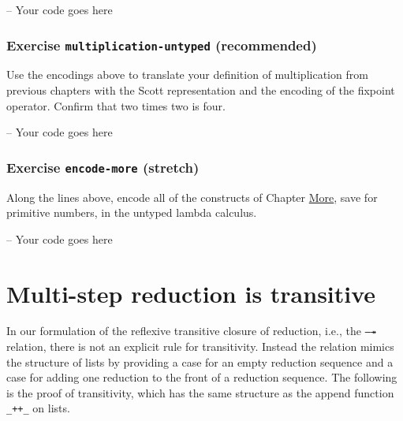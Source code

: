 \begin{fence}
\begin{code}
-- Your code goes here
\end{code}
\end{fence}

\hypertarget{exercise-multiplication-untyped-recommended}{%
\subsubsection{\texorpdfstring{Exercise \texttt{multiplication-untyped}
(recommended)}{Exercise multiplication-untyped (recommended)}}\label{exercise-multiplication-untyped-recommended}}

Use the encodings above to translate your definition of multiplication
from previous chapters with the Scott representation and the encoding of
the fixpoint operator. Confirm that two times two is four.

\begin{fence}
\begin{code}
-- Your code goes here
\end{code}
\end{fence}

\hypertarget{exercise-encode-more-stretch}{%
\subsubsection{\texorpdfstring{Exercise \texttt{encode-more}
(stretch)}{Exercise encode-more (stretch)}}\label{exercise-encode-more-stretch}}

Along the lines above, encode all of the constructs of Chapter
\protect\hyperlink{More}{More}, save for primitive numbers, in the
untyped lambda calculus.

\begin{fence}
\begin{code}
-- Your code goes here
\end{code}
\end{fence}

\hypertarget{multi-step-reduction-is-transitive}{%
\section{Multi-step reduction is
transitive}\label{multi-step-reduction-is-transitive}}

In our formulation of the reflexive transitive closure of reduction,
i.e., the \texttt{—↠} relation, there is not an explicit rule for
transitivity. Instead the relation mimics the structure of lists by
providing a case for an empty reduction sequence and a case for adding
one reduction to the front of a reduction sequence. The following is the
proof of transitivity, which has the same structure as the append
function \texttt{\_++\_} on lists.

